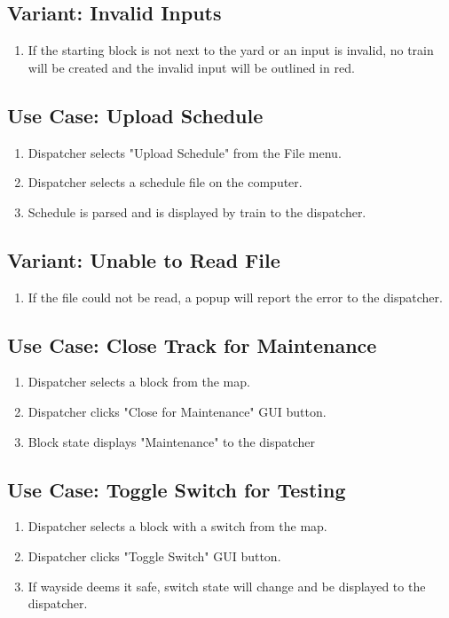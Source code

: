 \documentclass{scrreprt}
\begin{document}
\subsection{Variant: Invalid Inputs}
\begin{enumerate}[label=\arabic*a., start=3]
	\item If the starting block is not next to the yard or an input is invalid, no train will be created and the invalid input will be outlined in red.
\end{enumerate}

\subsection{Use Case: Upload Schedule}
\begin{enumerate}
	\item Dispatcher selects "Upload Schedule" from the File menu.
	\item Dispatcher selects a schedule file on the computer.
	\item Schedule is parsed and is displayed by train to the dispatcher.
\end{enumerate}

\subsection{Variant: Unable to Read File}
\begin{enumerate}[label=\arabic*a., start=3]
	\item If the file could not be read, a popup will report the error to the dispatcher.
\end{enumerate}

\subsection{Use Case: Close Track for Maintenance}
\begin{enumerate}
	\item Dispatcher selects a block from the map.
	\item Dispatcher clicks "Close for Maintenance" GUI button.
	\item Block state displays "Maintenance" to the dispatcher
\end{enumerate}

\subsection{Use Case: Toggle Switch for Testing}
\begin{enumerate}
	\item Dispatcher selects a block with a switch from the map.
	\item Dispatcher clicks "Toggle Switch" GUI button.
	\item If wayside deems it safe, switch state will change and be displayed to the dispatcher.
\end{enumerate}
\end{document}
